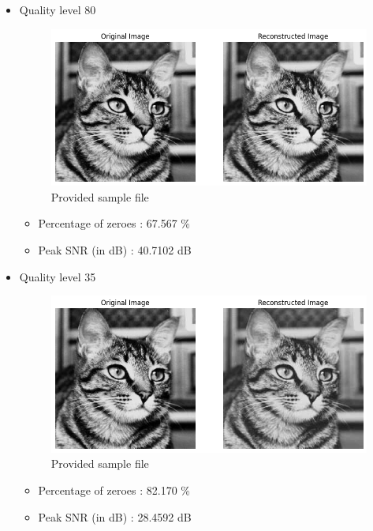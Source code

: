 \documentclass[11pt,a4paper]{article}
\begin{document}
\begin{itemize}
    \item Quality level 80
    {\begin{figure}[h]
        \centering
        \includegraphics[width=1.0\linewidth]{images/im4q1.png}
        \caption{Provided sample file}
    \end{figure}}

    \begin{itemize}
        \item Percentage of zeroes : 67.567 \%
        \item Peak SNR (in dB)     : 40.7102 dB
    \end{itemize}



    \item Quality level 35
    {\begin{figure}[h]
        \centering
        \includegraphics[width=1.0\linewidth]{images/im4q2.png}
        \caption{Provided sample file}
    \end{figure}}

    \begin{itemize}
        \item Percentage of zeroes : 82.170 \%
        \item Peak SNR (in dB)     : 28.4592 dB
    \end{itemize}


\end{itemize}
\end{document}
